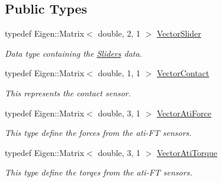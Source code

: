 \subsection*{Public Types}
\begin{DoxyCompactItemize}
\item 
\mbox{\label{classblmc__robots_1_1Teststand_a201214fc01f68b97ceba62af3fb8cccf}} 
typedef Eigen\+::\+Matrix$<$ double, 2, 1 $>$ \hyperlink{classblmc__robots_1_1Teststand_a201214fc01f68b97ceba62af3fb8cccf}{Vector\+Slider}
\begin{DoxyCompactList}\small\item\em Data type containing the \hyperlink{classblmc__robots_1_1Sliders}{Sliders} data. \end{DoxyCompactList}\item 
\mbox{\label{classblmc__robots_1_1Teststand_a23b0a73bc99ce4a3588204b7480eb6d7}} 
typedef Eigen\+::\+Matrix$<$ double, 1, 1 $>$ \hyperlink{classblmc__robots_1_1Teststand_a23b0a73bc99ce4a3588204b7480eb6d7}{Vector\+Contact}
\begin{DoxyCompactList}\small\item\em This represents the contact sensor. \end{DoxyCompactList}\item 
\mbox{\label{classblmc__robots_1_1Teststand_a51f17cf2b01dd8252e21db97b486e067}} 
typedef Eigen\+::\+Matrix$<$ double, 3, 1 $>$ \hyperlink{classblmc__robots_1_1Teststand_a51f17cf2b01dd8252e21db97b486e067}{Vector\+Ati\+Force}
\begin{DoxyCompactList}\small\item\em This type define the forces from the ati-\/\+FT sensors. \end{DoxyCompactList}\item 
\mbox{\label{classblmc__robots_1_1Teststand_a466977786f9b007854fa2eb2a97b0de9}} 
typedef Eigen\+::\+Matrix$<$ double, 3, 1 $>$ \hyperlink{classblmc__robots_1_1Teststand_a466977786f9b007854fa2eb2a97b0de9}{Vector\+Ati\+Torque}
\begin{DoxyCompactList}\small\item\em This type define the torqes from the ati-\/\+FT sensors. \end{DoxyCompactList}\end{DoxyCompactItemize}
